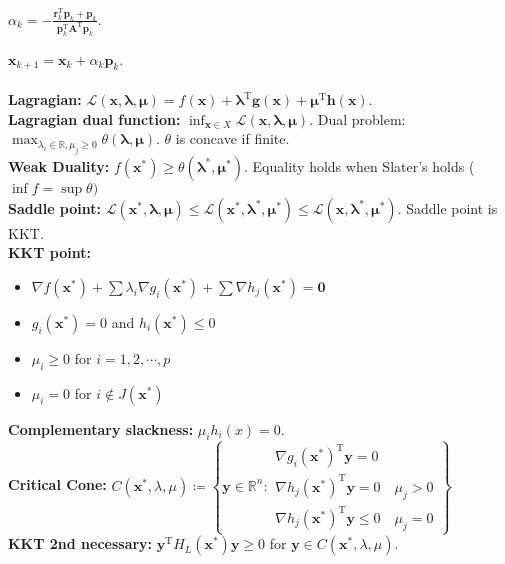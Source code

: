 \documentclass[12pt]{article}
\newcommand{\R}{\mathbb{R}}
\begin{document}
\begin{multicols*}{3}
        $\alpha_k = -\frac{\bm{r}_k^{\mathrm{T}}\bm{p}_k + \bm{p}_k}{\bm{p}_k^{\mathrm{T}}\bm{A}^{\mathrm{T}}\bm{p}_k}$.

        $\bm{x}_{k + 1} = \bm{x}_k + \alpha_k\bm{p}_k$.
        \\\\
        \textbf{Lagragian:} $\mathcal{L}(\bm{x}, \bm{\lambda}, \bm{\mu}) = f(\bm{x}) + \bm{\lambda}^{\mathrm{T}}\bm{g}(\bm{x}) + \bm{\mu}^{\mathrm{T}}\bm{h}(\bm{x})$.
        \\
        \textbf{Lagragian dual function:} $\inf_{\bm{x} \in X}\mathcal{L}(\bm{x}, \bm{\lambda}, \bm{\mu})$. Dual problem: $\max_{\lambda_i \in \R, \mu_j \geq 0}\theta(\bm{\lambda}, \bm{\mu})$. $\theta$ is concave if finite.
        \\
        \textbf{Weak Duality:} $f(\bm{x}^*) \geq \theta(\bm{\lambda}^*, \bm{\mu}^*)$. Equality holds when Slater's holds ($\inf f = \sup \theta)$
        \\
        \textbf{Saddle point:} $\mathcal{L}(\bm{x}^*, \bm{\lambda}, \bm{\mu}) \leq \mathcal{L}(\bm{x}^*, \bm{\lambda}^*, \bm{\mu}^*) \leq \mathcal{L}(\bm{x}, \bm{\lambda}^*, \bm{\mu}^*)$. Saddle point is KKT.
        \\
        \textbf{KKT point:} 
        \begin{itemize}
            \item $\nabla f(\bm{x}^*) + \sum\lambda_i\nabla g_i(\bm{x}^*) + \sum\nabla h_j(\bm{x}^*) = \mathbf{0}$
            \item $g_i(\bm{x}^*) = 0$ and $h_i(\bm{x}^*) \leq 0$
            \item $\mu_i \geq 0$ for $i = 1, 2, \cdots, p$
            \item $\mu_i = 0$ for $i \notin J(\bm{x}^*)$
        \end{itemize}
        \textbf{Complementary slackness:} $\mu_ih_i(x) = 0$.
        \\
        \textbf{Critical Cone: } $C(\bm{x}^*, \lambda, \mu) \coloneqq \left\{\bm{y} \in \R^n \colon \begin{array}{l}
            \nabla g_i(\bm{x}^*)^{\mathrm{T}}\bm{y} = 0 \\
            \nabla h_j(\bm{x}^*)^{\mathrm{T}}\bm{y} = 0 \quad\mu_j > 0 \\
            \nabla h_j(\bm{x}^*)^{\mathrm{T}}\bm{y} \leq 0 \quad\mu_j = 0
        \end{array}\right\}$
        \\
        \textbf{KKT 2nd necessary: } $\bm{y}^{\mathrm{T}}H_{L}(\bm{x}^*)\bm{y} \geq 0$ for $\bm{y} \in C(\bm{x}^*, \lambda, \mu)$.

\end{multicols*}
\end{document}
